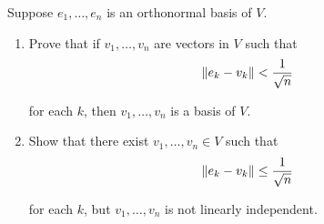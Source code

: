 \begin{exercise}
    Suppose $e_{1}, \ldots, e_{n}$ is an orthonormal basis of $V$.
    \begin{enumerate}[label={(\alph*)}]
        \item Prove that if $v_{1}, \ldots, v_{n}$ are vectors in $V$ such that
              \[
                  \left\Vert{e_{k} - v_{k}}\right\Vert < \frac{1}{\sqrt{n}}
              \]

              for each $k$, then $v_{1} , \ldots, v_{n}$ is a basis of $V$.
        \item Show that there exist $v_{1}, \ldots, v_{n}\in V$ such that
              \[
                  \left\Vert{e_{k} - v_{k}}\right\Vert \leq \frac{1}{\sqrt{n}}
              \]

              for each $k$, but $v_{1} , \ldots, v_{n}$ is not linearly independent.
    \end{enumerate}
\end{exercise}

